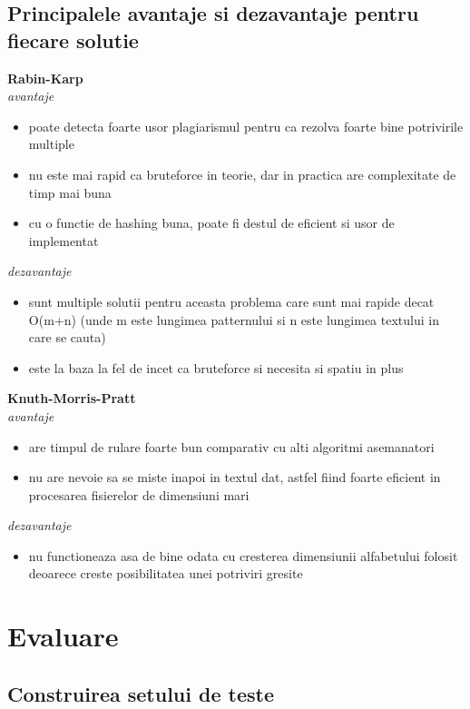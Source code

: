 \documentclass[runningheads]{llncs}
\begin{document}
\subsection{Principalele avantaje si dezavantaje pentru fiecare solutie}
\textbf{Rabin-Karp} \\
\textit{avantaje} 
\begin{itemize}
\item poate detecta foarte usor plagiarismul pentru ca rezolva foarte bine potrivirile multiple
\item nu este mai rapid ca bruteforce in teorie, dar in practica are complexitate de timp mai buna
\item cu o functie de hashing buna, poate fi destul de eficient si usor de implementat
\end{itemize}
\textit{dezavantaje}
\begin{itemize}
\item sunt multiple solutii pentru aceasta problema care sunt mai rapide decat O(m+n) (unde m este lungimea patternului si n este lungimea textului in care se cauta)
\item este la baza la fel de incet ca bruteforce si necesita si spatiu in plus
\end{itemize}
\textbf{Knuth-Morris-Pratt} \\
\textit{avantaje}
\begin{itemize}
\item are timpul de rulare foarte bun comparativ cu alti algoritmi asemanatori
\item nu are nevoie sa se miste inapoi in textul dat, astfel fiind foarte eficient in procesarea fisierelor de dimensiuni mari
\end{itemize}
\textit{dezavantaje}
\begin{itemize}
\item nu functioneaza asa de bine odata cu cresterea dimensiunii alfabetului folosit deoarece creste posibilitatea unei potriviri gresite
\end{itemize}

\section{Evaluare}
\subsection{Construirea setului de teste}
\end{document}
